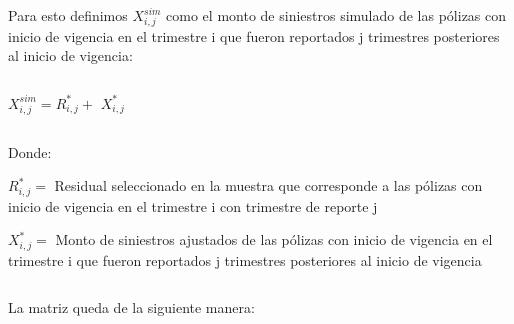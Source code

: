 \documentclass[11pt,twoside,openright,spanish]{report}
\numberwithin{equation}{chapter}
\numberwithin{figure}{chapter}
\numberwithin{table}{chapter}
\begin{document}
	\doublespacing
	
	Para esto definimos $X_{i,j}^{sim}$ como el monto de siniestros simulado de las pólizas con inicio de vigencia en el trimestre i que fueron reportados j trimestres posteriores al inicio de vigencia:

	\doublespacing

$ $

\doublespacing
	
		{\centering
	$X_{i,j}^{sim}=R_{i,j}^{*}+$  $X_{i,j}^{*}$
	\noindent
	
}
	\doublespacing

$ $

\doublespacing
	
	Donde:
	
	\doublespacing
	
	$R_{i,j}^{*}=$ Residual seleccionado en la muestra que corresponde a las pólizas con inicio de vigencia en el trimestre i con trimestre de reporte j
	
	$X_{i,j}^{*}=$ Monto de siniestros ajustados de las pólizas con inicio de vigencia en el trimestre i que fueron reportados j trimestres posteriores al inicio de vigencia


	\doublespacing

$ $

La matriz queda de la siguiente manera:
	\doublespacing

$ $


\doublespacing
	
\end{document}
